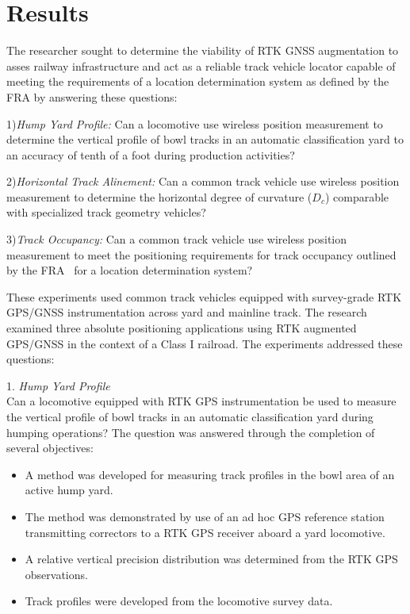 \chapter{Results}
The researcher sought to determine the viability of RTK GNSS augmentation to asses railway infrastructure and act as a reliable track vehicle locator capable of meeting the requirements of a location determination system as defined by the FRA by answering these questions:

1)\emph{Hump Yard Profile:}
Can a locomotive use wireless position measurement to determine the vertical profile of bowl tracks in an automatic classification yard to an accuracy of tenth of a foot during production activities?

2)\emph{Horizontal Track Alinement:}
Can a common track vehicle use wireless position measurement to determine the horizontal degree of curvature ($D_c$) comparable with specialized track geometry vehicles?

3)\emph{Track Occupancy:}
Can a common track vehicle use wireless position measurement to meet the positioning requirements for track occupancy outlined by the FRA~\citep[pp.6-7]{1995FRADiffe} for a location determination system?

These experiments used common track vehicles equipped with survey-grade RTK GPS/GNSS instrumentation across yard and mainline track. The research examined three absolute positioning applications using RTK augmented GPS/GNSS in the context of a Class I railroad. The experiments addressed these questions:

1. \emph{Hump Yard Profile}\\
Can a locomotive equipped with RTK GPS instrumentation be used to measure the  vertical profile of bowl tracks in an automatic classification yard during humping operations?
The question was answered through the completion of several objectives:
\begin{itemize}
\item A method was developed for measuring track profiles in the bowl area of an active hump yard.
\item The method was demonstrated by use of an ad hoc GPS reference station transmitting correctors to a RTK GPS receiver aboard a yard locomotive. 
\item A relative vertical precision distribution was determined from the RTK GPS observations.
\item Track profiles were developed from the locomotive survey data.
\end{itemize}

